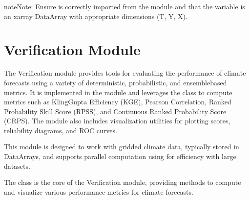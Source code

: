\documentclass[letterpaper,10pt,english]{sphinxmanual}
\begin{document}
\begin{sphinxadmonition}{note}{Note:}
\sphinxAtStartPar
Ensure  is correctly imported from the  module and that the  variable is an xarray DataArray with appropriate dimensions (T, Y, X).
\end{sphinxadmonition}

\sphinxstepscope


\section{Verification Module}
\label{\detokenize{Verification:verification-module}}\label{\detokenize{Verification::doc}}
\sphinxAtStartPar
The Verification module provides tools for evaluating the performance of climate forecasts using a variety of deterministic, probabilistic, and ensemble\sphinxhyphen{}based metrics. It is implemented in the  module and leverages the  class to compute metrics such as Kling\sphinxhyphen{}Gupta Efficiency (KGE), Pearson Correlation, Ranked Probability Skill Score (RPSS), and Continuous Ranked Probability Score (CRPS). The module also includes visualization utilities for plotting scores, reliability diagrams, and ROC curves.

\sphinxAtStartPar
This module is designed to work with gridded climate data, typically stored in  DataArrays, and supports parallel computation using  for efficiency with large datasets.

\sphinxAtStartPar
The  class is the core of the Verification module, providing methods to compute and visualize various performance metrics for climate forecasts.

\sphinxAtStartPar
{}

\begin{sphinxVerbatim}[commandchars=\\\{\}]
 

  
\end{sphinxVerbatim}
\end{document}
